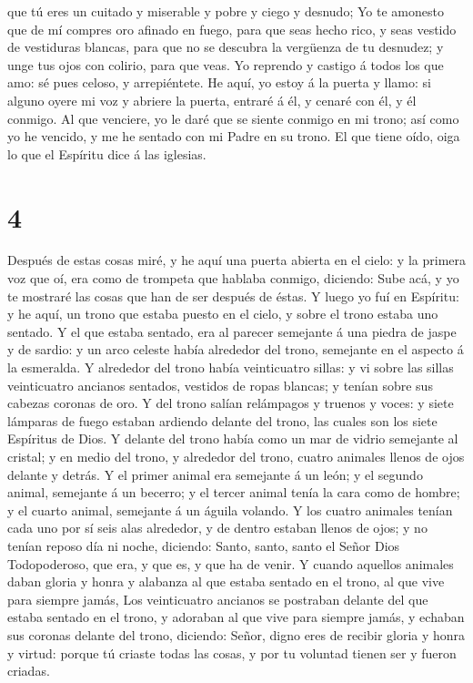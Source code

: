 que tú eres un cuitado y miserable y pobre y ciego y desnudo;
 Yo te amonesto que de mí compres oro afinado en fuego,
para que seas hecho rico, y seas vestido de vestiduras blancas, para que
no se descubra la vergüenza de tu desnudez; y unge tus ojos con colirio,
para que veas.  Yo reprendo y castigo á todos los que
amo: sé pues celoso, y arrepiéntete.  He aquí, yo estoy á
la puerta y llamo: si alguno oyere mi voz y abriere la puerta, entraré á
él, y cenaré con él, y él conmigo.  Al que venciere, yo
le daré que se siente conmigo en mi trono; así como yo he vencido, y me
he sentado con mi Padre en su trono.  El que tiene oído,
oiga lo que el Espíritu dice á las iglesias.

\hypertarget{section-3}{%
\section{4}\label{section-3}}

 Después de estas cosas miré, y he aquí una puerta abierta
en el cielo: y la primera voz que oí, era como de trompeta que hablaba
conmigo, diciendo: Sube acá, y yo te mostraré las cosas que han de ser
después de éstas.  Y luego yo fuí en Espíritu: y he aquí,
un trono que estaba puesto en el cielo, y sobre el trono estaba uno
sentado.  Y el que estaba sentado, era al parecer
semejante á una piedra de jaspe y de sardio: y un arco celeste había
alrededor del trono, semejante en el aspecto á la esmeralda.
 Y alrededor del trono había veinticuatro sillas: y vi
sobre las sillas veinticuatro ancianos sentados, vestidos de ropas
blancas; y tenían sobre sus cabezas coronas de oro.  Y del
trono salían relámpagos y truenos y voces: y siete lámparas de fuego
estaban ardiendo delante del trono, las cuales son los siete Espíritus
de Dios.  Y delante del trono había como un mar de vidrio
semejante al cristal; y en medio del trono, y alrededor del trono,
cuatro animales llenos de ojos delante y detrás.  Y el
primer animal era semejante á un león; y el segundo animal, semejante á
un becerro; y el tercer animal tenía la cara como de hombre; y el cuarto
animal, semejante á un águila volando.  Y los cuatro
animales tenían cada uno por sí seis alas alrededor, y de dentro estaban
llenos de ojos; y no tenían reposo día ni noche, diciendo: Santo, santo,
santo el Señor Dios Todopoderoso, que era, y que es, y que ha de venir.
 Y cuando aquellos animales daban gloria y honra y
alabanza al que estaba sentado en el trono, al que vive para siempre
jamás,  Los veinticuatro ancianos se postraban delante
del que estaba sentado en el trono, y adoraban al que vive para siempre
jamás, y echaban sus coronas delante del trono, diciendo:
 Señor, digno eres de recibir gloria y honra y virtud:
porque tú criaste todas las cosas, y por tu voluntad tienen ser y fueron
criadas.

